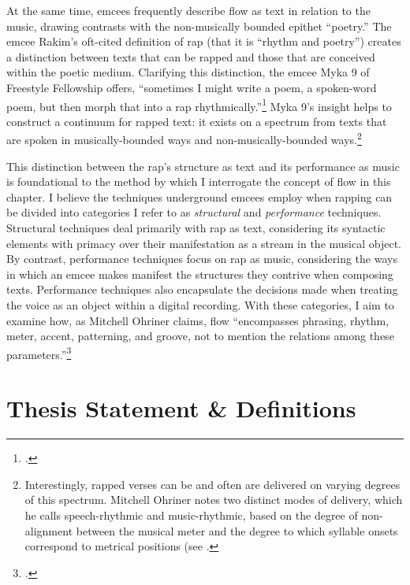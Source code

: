 At the same time, emcees frequently describe flow as text in relation to the music, drawing 
contrasts with the non-musically bounded epithet ``poetry.'' The emcee Rakim's oft-cited 
definition of rap (that it is ``rhythm and poetry'') creates a distinction between texts that
can be rapped and those that are conceived within the poetic medium. Clarifying this distinction,
the emcee Myka 9 of Freestyle Fellowship offers, ``sometimes I might write a poem, a spoken-word
poem, but then morph that into a rap rhythmically.''\footnote{
    \autocite[63]{pauledwardsHowRapArt2009}.}
Myka 9's insight helps to construct a continuum for rapped text: it exists on a spectrum from 
texts that are spoken in musically-bounded ways and non-musically-bounded ways.\footnote{
    Interestingly, rapped verses can be and often are delivered on varying degrees of this
    spectrum. Mitchell Ohriner notes two distinct modes of delivery, which he calls speech-rhythmic
    and music-rhythmic, based on the degree of non-alignment between the musical meter and the 
    degree to which syllable onsets correspond to metrical positions (see 
    \cite{mitchellohrinerLyricRhythmNonalignment2019}.}

This distinction between the rap's structure as text and its performance as music is 
foundational to the method by which I interrogate the concept of flow in this chapter. 
I believe the techniques underground emcees employ when rapping can be divided into 
categories I refer to as \emph{structural} and \emph{performance} techniques. Structural
techniques deal primarily with rap as text, considering its syntactic elements with 
primacy  over their manifestation as a stream in the musical object. By contrast, 
performance techniques focus on rap as music, considering the ways in which an emcee 
makes manifest the structures they contrive when composing texts. Performance techniques
also encapsulate the decisions made when treating the voice as an object within a 
digital recording. With these categories, I aim to examine how, as Mitchell Ohriner 
claims, flow ``encompasses phrasing, rhythm, meter, accent, patterning, and groove, not
to mention the relations among these parameters.''\footnote{
    \autocite[28]{mitchellohrinerFlowRhythmicVoice2019}.}

\section{Thesis Statement \& Definitions}

